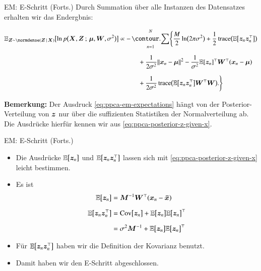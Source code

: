 \begin{frame}{EM: E-Schritt (Forts.)}{}
	Durch Summation über alle Instanzen des Datensatzes erhalten wir das Endergbnis:
	\begin{boxGray}
		\begin{equation} \label{eq:ppca-em-expectations}
			\begin{aligned}
				\E_{\bZ \sim \normdense(\bZ\,\mid\,\bX)}\bigl[ \ln p\bigl( \bX, \bZ \param \bmu, \bW, \sigma^2 \bigr) \bigr]
					&\propto -\sum_{n=1}^N \Biggl\{
						\frac{M}{2} \ln\bigl( 2 \pi \sigma^2 \bigr) + \frac{1}{2} \trace\bigl( \E\bigl[ \bz_n \bz_n^\top \bigr] \bigr)
				\\[2mm]
					&\qquad\quad + \frac{1}{2 \sigma^2} \Vert \bx_n - \bmu \Vert^2
						- \frac{1}{\sigma^2} \E[\bz_n]^\top \bW^\top (\bx_n - \bmu)
				\\[2mm]
					&\qquad\quad + \frac{1}{2 \sigma^2} \trace\bigl( \E\bigl[ \bz_n \bz_n^\top \bigr] \bW^\top \bW \bigr).
					\Biggr\}
			\end{aligned}
		\end{equation}
	\end{boxGray}
	
	\begin{boxGray}
		\textbf{Bemerkung:} Der Ausdruck \eqref{eq:ppca-em-expectations} hängt von der Posterior-Verteilung von $\bm{z}$
		nur über die suffizienten Statistiken der Normalverteilung ab. Die Ausdrücke hierfür kennen wir aus
		\eqref{eq:ppca-posterior-z-given-x}.
	\end{boxGray}
\end{frame}


\begin{frame}{EM: E-Schritt (Forts.)}{}
	\begin{itemize}
		\item Die Ausdrücke $\mathbb{E}\bigl[ \bm{z}_n \bigr]$ und $\mathbb{E}\bigl[ \bm{z}_n \bm{z}_n^\top \bigr]$ lassen sich mit \eqref{eq:ppca-posterior-z-given-x}
			leicht bestimmen.
		\item Es ist
		\begin{equation}
			\begin{aligned}
				\mathbb{E}\bigl[ \bm{z}_n \bigr]
					&= \bm{M}^{-1} \bm{W}^\top (\bm{x}_n - \bm{\bar{x}})
			\\[2mm]
				\mathbb{E}\bigl[ \bm{z}_n \bm{z}_n^\top \bigr]
					&= \text{Cov}\bigl[ \bm{z}_n \bigr] + \mathbb{E}\bigl[ \bm{z}_n \bigr] \mathbb{E}\bigl[ \bm{z}_n \bigr]^\top
			\\[2mm]
					&= \sigma^2 \bm{M}^{-1} + \mathbb{E}\bigl[ \bm{z}_n \bigr] \mathbb{E}\bigl[ \bm{z}_n \bigr]^\top
			\end{aligned}
		\end{equation}
		\item Für $\mathbb{E}\bigl[ \bm{z}_n \bm{z}_n^\top \bigr]$ haben wir die Definition der Kovarianz benutzt.
		\item Damit haben wir den E-Schritt abgeschlossen.
	\end{itemize}
\end{frame}


